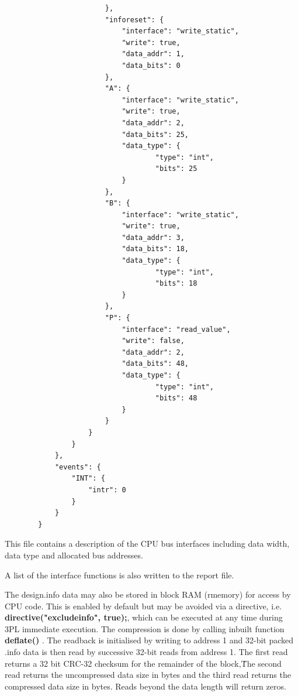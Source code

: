 \begin{verbatim}
                        },
                        "inforeset": {
                            "interface": "write_static",
                            "write": true,
                            "data_addr": 1,
                            "data_bits": 0
                        },
                        "A": {
                            "interface": "write_static",
                            "write": true,
                            "data_addr": 2,
                            "data_bits": 25,
                            "data_type": {
                                    "type": "int",
                                    "bits": 25
                            }
                        },
                        "B": {
                            "interface": "write_static",
                            "write": true,
                            "data_addr": 3,
                            "data_bits": 18,
                            "data_type": {
                                    "type": "int",
                                    "bits": 18
                            }
                        },
                        "P": {
                            "interface": "read_value",
                            "write": false,
                            "data_addr": 2,
                            "data_bits": 48,
                            "data_type": {
                                    "type": "int",
                                    "bits": 48
                            }
                        }
                    }
                }
            },
            "events": {
                "INT": {
                    "intr": 0
                }
            }
        }

    \end{verbatim}
    This file contains a description of the CPU bus interfaces including data
    width, data type and allocated bus addresses.

    A list of the interface functions is also written to the report file.

    The design.info data may also be stored in block RAM (rmemory) for access by
    CPU code. This is enabled by default but may be avoided via a directive,
    i.e. {\bf directive("excludeinfo", true);}, which can be executed at any
    time during 3PL immediate execution. The compression is done by calling
    inbuilt function {\bf deflate()} . The readback is
    initialised by writing to address 1 and 32-bit packed .info data is then
    read by successive 32-bit reads from address 1. The first read returns a 32
    bit CRC-32 checksum for the remainder of the block,\. The second read
    returns the uncompressed data size in bytes and the third read returns the
    compressed data size in bytes. Reads beyond the data length will return
    zeros.

